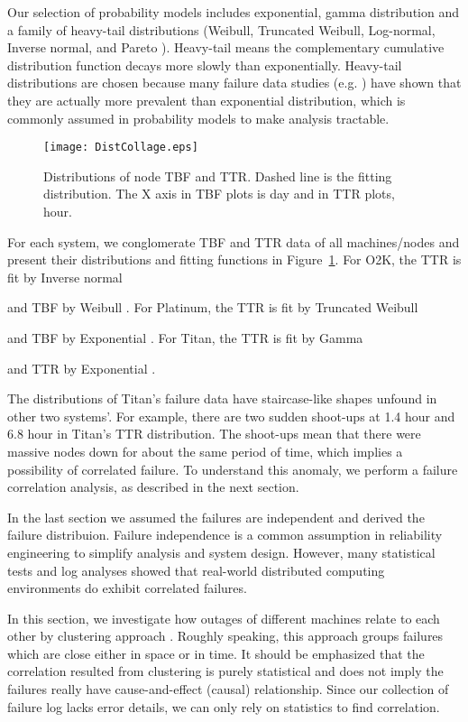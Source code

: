 \documentclass[10pt,twocolumn]{article}
\begin{document}
Our selection of probability models includes exponential, gamma
distribution and a family of heavy-tail distributions (Weibull, 
Truncated Weibull, Log-normal, Inverse normal, and Pareto 
\cite{JohnsonBook}). Heavy-tail means the complementary cumulative 
distribution function   decays more slowly than exponentially. 
Heavy-tail distributions are chosen because many failure data 
studies (e.g. \cite{Nurmi:03,Heath:01}) have shown that they are actually 
more prevalent than exponential distribution, which is 
commonly assumed in probability models to make analysis 
tractable.

\begin{figure}
   \begin{center}
   \texttt{[image: DistCollage.eps]} 
    \caption{Distributions of node TBF and TTR. Dashed line is 
    the fitting distribution.     The X axis in TBF plots is 
    day and in TTR plots, hour.}
    \label{fig:DistCollage}
   \end{center}
\end{figure}

For each system, we conglomerate TBF and TTR data of all 
machines/nodes and present their distributions and fitting 
functions in Figure~\ref{fig:DistCollage}. For O2K, the TTR is 
fit by Inverse normal 

and TBF by Weibull .
For Platinum, the TTR is fit by Truncated Weibull

and TBF by Exponential .
For Titan, the TTR is fit by Gamma 

and TTR by Exponential .

The distributions of Titan's failure data have 
staircase-like shapes unfound in other 
two systems'. For example, there are two sudden 
shoot-ups at 1.4 hour and 6.8 hour in Titan's TTR 
distribution. The shoot-ups mean that there were 
massive nodes down for about the same period of 
time, which implies a possibility of correlated 
failure. To understand this anomaly, we perform
a failure correlation analysis, as described in
the next section.

\label{s:corr}
In the last section we assumed the failures are
independent and derived the failure distribuion.
Failure independence is a common assumption in 
reliability engineering to simplify analysis
and system design. However, many statistical tests
and log analyses showed that real-world distributed 
computing environments do exhibit correlated 
failures. 

In this section, we investigate how outages 
of different machines relate to each other by 
clustering approach \cite{NTfailureAnalysis1}. Roughly 
speaking, this approach groups failures which are 
close either in space or in time. It should be 
emphasized that the correlation resulted from 
clustering is purely statistical and does not 
imply the failures really have cause-and-effect 
(causal) relationship. Since our collection of 
failure log lacks error details, we can only
rely on statistics to find correlation.
\end{document}
